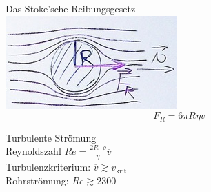\begin{rep*}[ note = Hydrodynamik ]
	Das Stoke'sche Reibungsgesetz \\
	\includegraphics{Bild107}
	\[ F_R = 6 \pi R \eta v \]
	
	Turbulente Strömung \\
	Reynoldszahl $Re = \frac{2R \cdot \rho}{\eta} \overline{v}$ \\
	Turbulenzkriterium: $\overline{v} \gtrsim v_{\text{krit}}$ \\
	Rohrströmung: $Re \gtrsim 2300$
\end{rep*}
